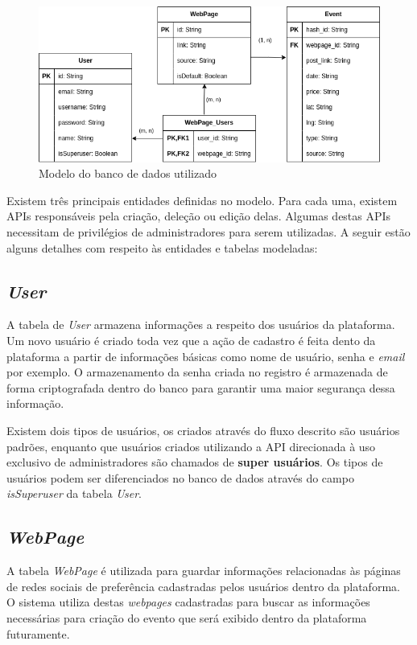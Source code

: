 \begin{figure}[h]
    \centering
    \includegraphics[width=1\textwidth]{figuras/typesTCCModel.png}
    \caption{Modelo do banco de dados utilizado}
    \label{fig:enter-label}
\end{figure}

Existem três principais entidades definidas no modelo. Para cada uma, existem
\acp{API} responsáveis pela criação, deleção ou edição delas. Algumas destas
\acp{API} necessitam de privilégios de administradores para serem utilizadas. A
seguir estão alguns detalhes com respeito às entidades e tabelas modeladas:

\subsection{\textit{User}}

A tabela de \textit{User} armazena informações a respeito dos usuários da
plataforma. Um novo usuário é criado toda vez que a ação de cadastro é feita
dento da plataforma a partir de informações básicas como nome de usuário, senha
e \textit{email} por exemplo. O armazenamento da senha criada no registro é
armazenada de forma criptografada dentro do banco para garantir uma maior
segurança dessa informação.

Existem dois tipos de usuários, os criados através do fluxo descrito são
usuários padrões, enquanto que usuários criados utilizando a \acs{API}
direcionada à uso exclusivo de administradores são chamados de \textbf{super
    usuários}. Os tipos de usuários podem ser diferenciados no banco de dados
através do campo \textit{isSuperuser} da tabela \textit{User}.

\subsection{\textit{WebPage}}

A tabela \textit{WebPage} é utilizada para guardar informações relacionadas às
páginas de redes sociais de preferência cadastradas pelos usuários dentro da
plataforma. O sistema utiliza destas \textit{webpages} cadastradas para buscar
as informações necessárias para criação do evento que será exibido dentro da
plataforma futuramente.

